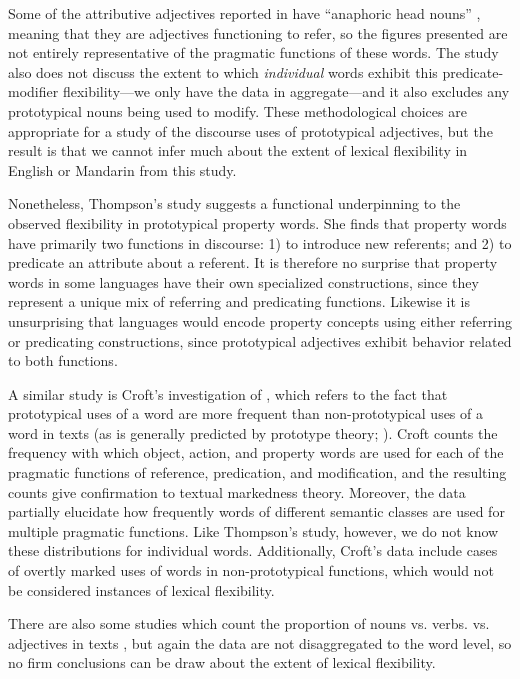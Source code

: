 \noindent Some of the attributive adjectives reported in  have \enquote{anaphoric head nouns} , meaning that they are adjectives functioning to refer, so the figures presented are not entirely representative of the pragmatic functions of these words. The study also does not discuss the extent to which \emph{individual} words exhibit this predicate-modifier flexibility—we only have the data in aggregate—and it also excludes any prototypical nouns being used to modify. These methodological choices are appropriate for a study of the discourse uses of prototypical adjectives, but the result is that we cannot infer much about the extent of lexical flexibility in English or Mandarin from this study.

Nonetheless, Thompson's study suggests a functional underpinning to the observed flexibility in prototypical property words. She finds that property words have primarily two functions in discourse: 1) to introduce new referents; and 2) to predicate an attribute about a referent. It is therefore no surprise that property words in some languages have their own specialized constructions, since they represent a unique mix of referring and predicating functions. Likewise it is unsurprising that languages would encode property concepts using either referring or predicating constructions, since prototypical adjectives exhibit behavior related to both functions.

A similar study is Croft's  investigation of , which refers to the fact that prototypical uses of a word are more frequent than non-prototypical uses of a word in texts (as is generally predicted by prototype theory; ). Croft counts the frequency with which object, action, and property words are used for each of the pragmatic functions of reference, predication, and modification, and the resulting counts give confirmation to textual markedness theory. Moreover, the data partially elucidate how frequently words of different semantic classes are used for multiple pragmatic functions. Like Thompson's  study, however, we do not know these distributions for individual words. Additionally, Croft's data include cases of overtly marked uses of words in non-prototypical functions, which would not be considered instances of lexical flexibility.

There are also some studies which count the proportion of nouns vs. verbs. vs. adjectives in texts , but again the data are not disaggregated to the word level, so no firm conclusions can be draw about the extent of lexical flexibility.

